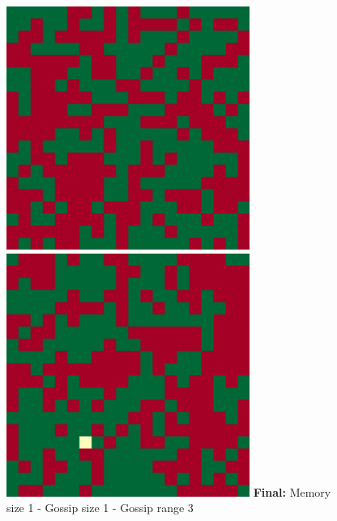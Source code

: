 \documentclass[english]{article}
\begin{document}
\begin{figure}[!hb]
{    \includegraphics[width=\textwidth/4]{spatial-memory5+gossip0+range0-B.pdf}
    \includegraphics[width=\textwidth/4]{spatial-memory5+gossip0+range0-C.pdf}
  }
  \textbf{Final:} Memory size 1 - Gossip size 1 - Gossip range 3

\end{figure}
\end{document}
